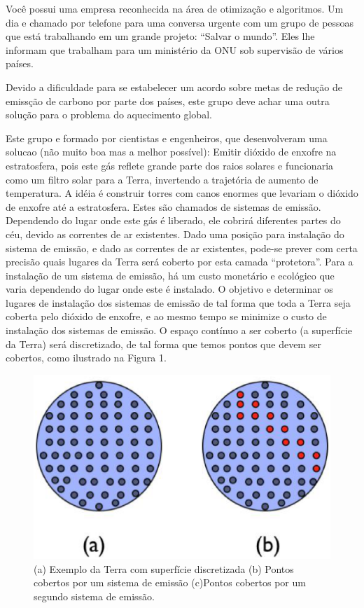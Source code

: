\documentclass[12pt]{article}
\begin{document}
Você possui uma empresa reconhecida na área de otimização e algoritmos. 
Um dia e chamado por telefone para uma conversa urgente com um grupo 
de pessoas que está trabalhando em um grande projeto: “Salvar o mundo”. 
Eles lhe informam que trabalham para um ministério da ONU sob 
supervisão de vários países.

Devido a dificuldade para se estabelecer um acordo sobre metas de 
redução de emissção de carbono por parte dos países, este grupo deve 
achar uma outra solução para o problema do aquecimento global. 

Este grupo e formado por cientistas e engenheiros, que desenvolveram
uma solucao (não muito boa mas a melhor possível): Emitir dióxido 
de enxofre na estratosfera, pois este gás reflete grande parte dos 
raios solares e funcionaria como um filtro solar para a Terra, 
invertendo a trajetória de aumento de temperatura. A idéia é construir 
torres com canos enormes que levariam o dióxido de enxofre até a estratosfera. 
Estes são chamados de sistemas de emissão. Dependendo do lugar onde 
este gás é liberado, ele cobrirá diferentes partes do céu, devido as 
correntes de ar existentes. Dado uma posição para instalação do sistema 
de emissão, e dado as correntes de ar existentes, pode-se prever com 
certa precisão quais lugares da Terra será coberto por esta camada 
“protetora”. Para a instalação de um sistema de emissão, há um custo 
monetário e ecológico que varia dependendo do lugar onde este é instalado. 
O objetivo e determinar os lugares de instalação dos sistemas de emissão 
de tal forma que toda a Terra seja coberta pelo dióxido de enxofre, e ao 
mesmo tempo se minimize o custo de instalação dos sistemas de emissão. 
O espaço contínuo a ser coberto (a superfície da Terra) será discretizado, 
de tal forma que temos pontos que devem ser cobertos, como ilustrado
na Figura 1. 

\begin{figure}
\centering
\includegraphics[width=.8\textwidth]{pontos.ps}
\caption{(a) Exemplo da Terra com superfície discretizada (b) Pontos 
cobertos por um sistema de emissão (c)Pontos cobertos por um segundo sistema de emissão.}
\end{figure}
\end{document}
